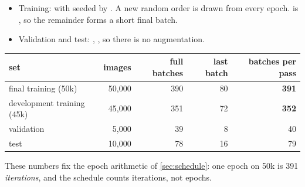 \begin{repo}
\begin{itemize}[nosep]
  \item Training:  with  seeded by . A new random order is drawn from  every epoch.  is , so the remainder forms a short final batch.
  \item Validation and test: , , so there is no augmentation.
\end{itemize}
\begin{center}
\begin{tabular}{@{}lrrrr@{}}
\toprule
set & images & full batches & last batch & batches per pass\\
\midrule
final training (50k) & 50{,}000 & 390 & 80 & \textbf{391}\\
development training (45k) & 45{,}000 & 351 & 72 & \textbf{352}\\
validation & 5{,}000 & 39 & 8 & 40\\
test & 10{,}000 & 78 & 16 & 79\\
\bottomrule
\end{tabular}
\end{center}
These numbers fix the epoch arithmetic of \cref{sec:schedule}: one epoch on 50k is 391 \emph{iterations}, and the schedule counts iterations, not epochs.
\end{repo}
